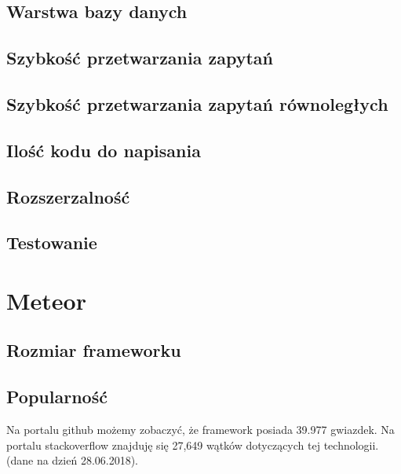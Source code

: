 \documentclass[12pt]{report}
\begin{document}
    \subsection{Warstwa bazy danych}
    \subsection{Szybkość przetwarzania zapytań}
    \subsection{Szybkość przetwarzania zapytań równoległych}
    \subsection{Ilość kodu do napisania}
    \subsection{Rozszerzalność}
    \subsection{Testowanie}

  \section{Meteor}
    \subsection{Rozmiar frameworku}
    \subsection{Popularność}
      Na portalu github możemy zobaczyć, że framework posiada 39.977 gwiazdek.
      Na portalu stackoverflow znajduję się 27,649 wątków dotyczących tej technologii.
      (dane na dzień 28.06.2018).
\end{document}
